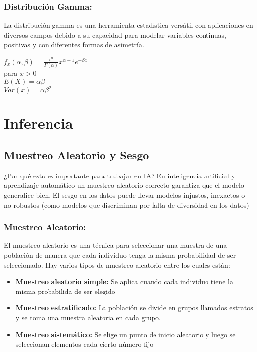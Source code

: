 \documentclass{report}
\begin{document}
\subsection{Distribución Gamma:}
La distribución gamma es una herramienta estadística versátil con aplicaciones en diversos campos debido a su capacidad para modelar variables continuas, positivas y con diferentes formas de asimetría.
\begin{multicols}{2}
    \(f_x(\alpha, \beta) = \frac{\beta^\alpha}{\Gamma(\alpha)}x^{\alpha-1}e^{-\beta x}\) \\ para \(x>0\)
    \\
    \(E(X) = \alpha \beta \) 
    \columnbreak
    \\
    \(Var(x) = \alpha \beta ^2\)
\end{multicols}
\chapter{Inferencia}
\section{Muestreo Aleatorio y Sesgo}
¿Por qué esto es importante para trabajar en IA? 
En inteligencia artificial y aprendizaje automático un muestreo aleatorio correcto garantiza que el modelo generalice bien. El sesgo en los datos puede llevar modelos injustos, inexactos o no robustos (como modelos que discriminan por falta de diversidad en los datos)
\subsection{Muestreo Aleatorio:}
El muestreo aleatorio es una técnica para seleccionar una muestra de una población de manera que cada individuo tenga la misma probabilidad de ser seleccionado. 
Hay varios tipos de muestreo aleatorio entre los cuales están:
\begin{itemize}
    \item \textbf{Muestreo aleatorio simple:} Se aplica cuando cada individuo tiene la misma probabilida de ser elegido 
    \item\textbf{Muestreo estratificado:} La población se divide en grupos llamados estratos y se toma una muestra aleatoria en cada grupo. 
    \item\textbf{Muestreo sistemático:} Se elige un punto de inicio aleatorio y luego se seleccionan elementos cada cierto número fijo. 
\end{itemize}
\end{document}
